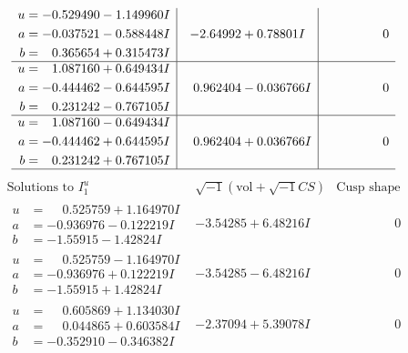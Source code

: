 \documentclass[1p]{elsarticle_modified}
\theoremstyle{definition}
\newcommand{\I}{\sqrt{-1}}
\begin{document}
$$\begin{array}{c|c|c}
\begin{aligned}
u &= -0.529490 - 1.149960 I \\
a &= -0.037521 - 0.588448 I \\
b &= \phantom{-}0.365654 + 0.315473 I\end{aligned}
 & -2.64992 + 0.78801 I & \phantom{-0.000000 } 0 \\ \hline\begin{aligned}
u &= \phantom{-}1.087160 + 0.649434 I \\
a &= -0.444462 - 0.644595 I \\
b &= \phantom{-}0.231242 - 0.767105 I\end{aligned}
 & \phantom{-}0.962404 - 0.036766 I & \phantom{-0.000000 } 0 \\ \hline\begin{aligned}
u &= \phantom{-}1.087160 - 0.649434 I \\
a &= -0.444462 + 0.644595 I \\
b &= \phantom{-}0.231242 + 0.767105 I\end{aligned}
 & \phantom{-}0.962404 + 0.036766 I & \phantom{-0.000000 } 0\\
 \hline 
 \end{array}$$\newpage$$\begin{array}{c|c|c}  
\text{Solutions to }I^u_{1}& \I (\text{vol} + \sqrt{-1}CS) & \text{Cusp shape}\\
 \hline 
\begin{aligned}
u &= \phantom{-}0.525759 + 1.164970 I \\
a &= -0.936976 - 0.122219 I \\
b &= -1.55915 - 1.42824 I\end{aligned}
 & -3.54285 + 6.48216 I & \phantom{-0.000000 } 0 \\ \hline\begin{aligned}
u &= \phantom{-}0.525759 - 1.164970 I \\
a &= -0.936976 + 0.122219 I \\
b &= -1.55915 + 1.42824 I\end{aligned}
 & -3.54285 - 6.48216 I & \phantom{-0.000000 } 0 \\ \hline\begin{aligned}
u &= \phantom{-}0.605869 + 1.134030 I \\
a &= \phantom{-}0.044865 + 0.603584 I \\
b &= -0.352910 - 0.346382 I\end{aligned}
 & -2.37094 + 5.39078 I & \phantom{-0.000000 } 0 \\ \hline\begin{aligned}

\end{aligned}
\end{array}$$
\end{document}

